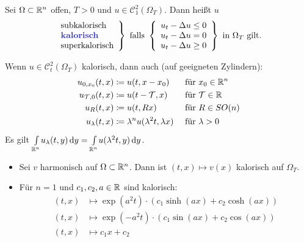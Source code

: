 \documentclass{cheat-sheet}
\newcommand{\Tau}{\mathcal{T}} %
\begin{document}

\begin{defn}
  Sei $\Omega \subset \mathbb{R}^n$ offen, $T > 0$ und $u \in \mathcal{C}^2_1(\Omega_T)$. Dann heißt $u$
  \begin{align*}
    \left. \begin{array}{l}
      \text{subkalorisch}\\
      \text{\emph{kalorisch}}\\
      \text{superkalorisch}\\
    \end{array} \right\}
    \text{ falls }
    \left\{ \begin{array}{l}
      u_t - \Delta u \leq 0\\
      u_t - \Delta u = 0\\
      u_t - \Delta u \geq 0
    \end{array} \right\}
    \text{ in $\Omega_T$ gilt.}
  \end{align*}
\end{defn}

\begin{bem}
  Wenn $u \in \mathcal{C}^2_t(\Omega_T)$ kalorisch, dann auch (auf geeigneten Zylindern):
  \begin{alignat*}{3}
    u_{0,x_0}(t,x) &\coloneqq u(t, x-x_0) &&\text{ für } x_0 \in \R^n\\
    u_{\Tau, 0}(t,x) &\coloneqq u(t-\Tau, x) &&\text{ für } \Tau \in \R\\
    u_R(t,x) &\coloneqq u(t, Rx) &&\text{ für } R \in SO(n)\\
    u_\lambda(t,x) &\coloneqq \lambda^{n} u(\lambda^2 t, \lambda x) &&\text{ für } \lambda > 0
  \end{alignat*}
  Es gilt ${\textstyle \int\limits_{\mathbb{R}^n}^{}} u_\lambda(t, y) \,\mathrm{d} y = {\textstyle \int\limits_{\mathbb{R}^n}^{}} u(\lambda^2 t, y) \,\mathrm{d} y$.
\end{bem}

\begin{bspe}
  \begin{itemize}
    \item Sei $v$ harmonisch auf $\Omega \subset \mathbb{R}^n$. Dann ist $(t, x) \mapsto v(x)$ kalorisch auf $\Omega_T$.
    \item Für $n=1$ und $c_1, c_2, a \in \mathbb{R}$ sind kalorisch:
    \begin{align*}
      (t, x) &\mapsto \exp(a^2 t) \cdot (c_1 \sinh(a x) + c_2 \cosh(a x))\\
      (t, x) &\mapsto \exp(-a^2 t) \cdot (c_1 \sin(a x) + c_2 \cos(a x))\\
      (t, x) &\mapsto c_1 x + c_2
    \end{align*}
  \end{itemize}
\end{bspe}
\end{document}
